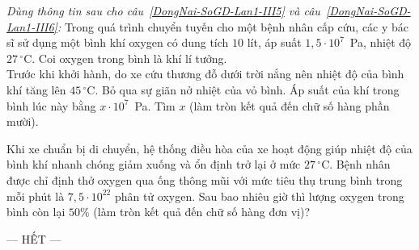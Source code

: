 	\begin{ex}%
		\label{DongNai-SoGD-Lan1-III5}\textit{Dùng thông tin sau cho câu~\ref{DongNai-SoGD-Lan1-III5} và câu~\ref{DongNai-SoGD-Lan1-III6}:} Trong quá trình chuyển tuyến cho một bệnh nhân cấp cứu, các y bác sĩ sử dụng một bình khí oxygen có dung tích $10$ lít, áp suất $1{,}5\cdot 10^7$~Pa, nhiệt độ $27\,^\circ\text{C}$. Coi oxygen trong bình là khí lí tưởng.\\
		Trước khi khởi hành, do xe cứu thương đỗ dưới trời nắng nên nhiệt độ của bình khí tăng lên $45\,^\circ\text{C}$. Bỏ qua sự giãn nở nhiệt của vỏ bình. Áp suất của khí trong bình lúc này bằng $x\cdot 10^7$~Pa. Tìm $x$ (làm tròn kết quả đến chữ số hàng phần mười).
		\par
	\end{ex}

	\begin{ex}%
		\label{DongNai-SoGD-Lan1-III6}Khi xe chuẩn bị di chuyển, hệ thống điều hòa của xe hoạt động giúp nhiệt độ của bình khí nhanh chóng giảm xuống và ổn định trở lại ở mức $27\,^\circ\text{C}$. Bệnh nhân được chỉ định thở oxygen qua ống thông mũi với mức tiêu thụ trung bình trong mỗi phút là $7{,}5\cdot 10^{22}$ phân tử oxygen. Sau bao nhiêu giờ thì lượng oxygen trong bình còn lại $50\%$ (làm tròn kết quả đến chữ số hàng đơn vị)?
		\par
	\end{ex}

	\centerline{--- HẾT ---}


